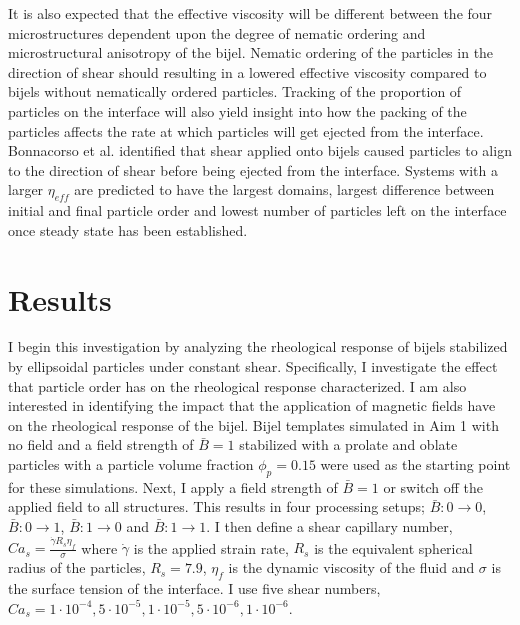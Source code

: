 It is also expected that the effective viscosity will be different between the four microstructures dependent upon the 
degree of nematic ordering and microstructural anisotropy of the bijel. Nematic ordering of the particles in the direction of shear
should resulting in a lowered effective viscosity compared to bijels without nematically 
ordered particles. \cite{xu_relation_2013, vermant_flow-induced_2005} Tracking of the proportion of particles on the 
interface will also yield insight into how the packing of the particles affects the rate at which particles will get 
ejected from the interface. Bonnacorso et al. identified that shear applied onto bijels caused particles to align to the direction of
shear before being ejected from the interface. Systems with a larger $\eta_{eff}$ are predicted to have the largest domains, largest 
difference between initial and final particle order and lowest number of particles left on the interface once steady 
state has been established. 

\section{Results}\label{sec:results_p3}

I begin this investigation by analyzing the rheological response of bijels stabilized by ellipsoidal particles under constant shear.
Specifically, I investigate the effect that particle order has on the rheological response characterized. I am also interested in
identifying the impact that the application of magnetic fields have on the rheological response of the bijel. 
Bijel templates simulated in Aim 1 with no field and a field strength of $\bar{B} = 1$ stabilized with a prolate and oblate particles with a 
particle volume fraction $\phi_p = 0.15$ were used as the starting point for these simulations. Next, I apply a field strength of
$\bar{B} = 1$ or switch off the applied field to all structures. This results in four processing setups; $\bar{B}:0\rightarrow 0$, $\bar{B}:0\rightarrow 1$,
$\bar{B}:1\rightarrow 0$ and $\bar{B}:1\rightarrow 1$. I then define a shear capillary number,  $Ca_s = \frac{\dot{\gamma} R_{s} \eta_{f}}{\sigma}$ where 
$\dot{\gamma}$ is the applied strain rate, $R_s$ is the equivalent spherical radius of the particles, $R_s = 7.9$, $\eta_f$ is the dynamic viscosity of the 
fluid and $\sigma$ is the surface tension of the interface. I use five shear numbers, $Ca_s = 1\cdot10^{-4}, 5\cdot10^{-5}, 1\cdot10^{-5}, 5\cdot10^{-6}, 1\cdot10^{-6}$.


